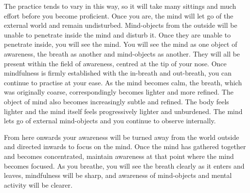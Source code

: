 The practice tends to vary in this way, so it will take many sittings and much effort before you become proficient. Once you are, the mind will let go of the external world and remain undisturbed. Mind-objects from the outside will be unable to penetrate inside the mind and disturb it. Once they are unable to penetrate inside, you will see the mind. You will see the mind as one object of awareness, the breath as another and mind-objects as another. They will all be present within the field of awareness, centred at the tip of your nose. Once mindfulness is firmly established with the in-breath and out-breath, you can continue to practise at your ease. As the mind becomes calm, the breath, which was originally coarse, correspondingly becomes lighter and more refined. The object of mind also becomes increasingly subtle and refined. The body feels lighter and the mind itself feels progressively lighter and unburdened. The mind lets go of external mind-objects and you continue to observe internally.

From here onwards your awareness will be turned away from the world outside and directed inwards to focus on the mind. Once the mind has gathered together and becomes concentrated, maintain awareness at that point where the mind becomes focused. As you breathe, you will see the breath clearly as it enters and leaves, mindfulness will be sharp, and awareness of mind-objects and mental activity will be clearer.


